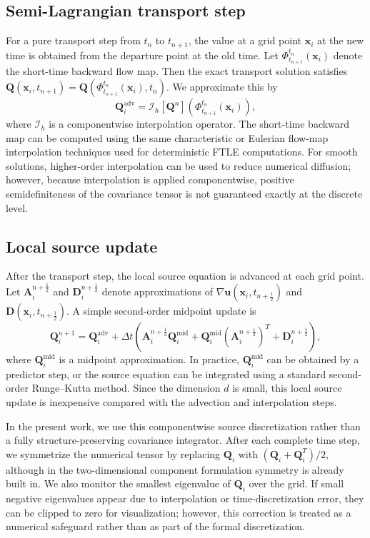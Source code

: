 \documentclass[a4paper,11pt]{article}
\numberwithin{equation}{section}
\theoremstyle{plain}
\theoremstyle{definition}
\theoremstyle{remark}
\newcommand{\bx}{\mathbf{x}}
\newcommand{\bu}{\mathbf{u}}
\newcommand{\bA}{\mathbf{A}}
\newcommand{\bD}{\mathbf{D}}
\newcommand{\bQ}{\mathbf{Q}}
\newcommand{\flow}[2]{\Phi_{#1}^{#2}}
\begin{document}
\subsection{Semi-Lagrangian transport step}

For a pure transport step from \(t_n\) to \(t_{n+1}\), the value at a grid point \(\bx_i\) at the new time is obtained from the departure point at the old time.  Let \(\flow{t_{n+1}}{t_n}(\bx_i)\) denote the short-time backward flow map.  Then the exact transport solution satisfies \(\bQ(\bx_i,t_{n+1})=\bQ(\flow{t_{n+1}}{t_n}(\bx_i),t_n)\).  We approximate this by
\begin{equation}
    \bQ_i^{\mathrm{adv}}
    =
    \mathcal{I}_h[\bQ^n]\!\left(\flow{t_{n+1}}{t_n}(\bx_i)\right),
    \label{eq:semi_lag_transport}
\end{equation}
where \(\mathcal{I}_h\) is a componentwise interpolation operator.  The short-time backward map can be computed using the same characteristic or Eulerian flow-map interpolation techniques used for deterministic FTLE computations.  For smooth solutions, higher-order interpolation can be used to reduce numerical diffusion; however, because interpolation is applied componentwise, positive semidefiniteness of the covariance tensor is not guaranteed exactly at the discrete level.

\subsection{Local source update}

After the transport step, the local source equation is advanced at each grid point.  Let \(\bA_i^{n+\frac12}\) and \(\bD_i^{n+\frac12}\) denote approximations of \(\nabla\bu(\bx_i,t_{n+\frac12})\) and \(\bD(\bx_i,t_{n+\frac12})\).  A simple second-order midpoint update is
\[
    \bQ_i^{n+1}
    =
    \bQ_i^{\mathrm{adv}}
    +
    \Delta t\left(
    \bA_i^{n+\frac12}\bQ_i^{\mathrm{mid}}
    +
    \bQ_i^{\mathrm{mid}}(\bA_i^{n+\frac12})^T
    +
    \bD_i^{n+\frac12}
    \right),
\]
where \(\bQ_i^{\mathrm{mid}}\) is a midpoint approximation.  In practice, \(\bQ_i^{\mathrm{mid}}\) can be obtained by a predictor step, or the source equation can be integrated using a standard second-order Runge--Kutta method.  Since the dimension \(d\) is small, this local source update is inexpensive compared with the advection and interpolation steps.

In the present work, we use this componentwise source discretization rather than a fully structure-preserving covariance integrator.  After each complete time step, we symmetrize the numerical tensor by replacing \(\bQ_i\) with \((\bQ_i+\bQ_i^T)/2\), although in the two-dimensional component formulation symmetry is already built in.  We also monitor the smallest eigenvalue of \(\bQ_i\) over the grid.  If small negative eigenvalues appear due to interpolation or time-discretization error, they can be clipped to zero for visualization; however, this correction is treated as a numerical safeguard rather than as part of the formal discretization.
\end{document}
